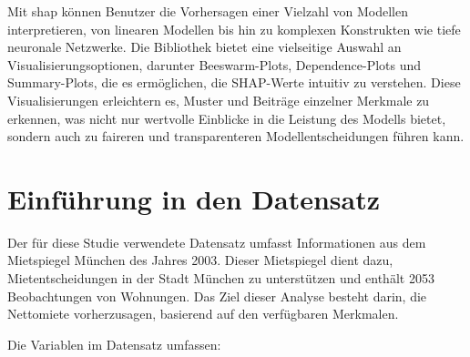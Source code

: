 Mit \textsf{shap} können Benutzer die Vorhersagen einer Vielzahl von Modellen interpretieren, 
von linearen Modellen bis hin zu komplexen Konstrukten wie tiefe neuronale Netzwerke. 
Die Bibliothek bietet eine vielseitige Auswahl an Visualisierungsoptionen, darunter Beeswarm-Plots, Dependence-Plots und 
Summary-Plots, die es ermöglichen, die SHAP-Werte intuitiv zu verstehen.
Diese Visualisierungen erleichtern es, Muster und Beiträge einzelner Merkmale zu erkennen, 
was nicht nur wertvolle Einblicke in die Leistung des Modells bietet, sondern auch zu faireren und transparenteren 
Modellentscheidungen führen kann. 

\section{Einführung in den Datensatz}

Der für diese Studie verwendete Datensatz umfasst Informationen aus dem Mietspiegel München des Jahres 2003. 
Dieser Mietspiegel dient dazu, Mietentscheidungen in der Stadt München zu unterstützen und enthält 
2053 Beobachtungen von Wohnungen. Das Ziel dieser Analyse besteht darin, die Nettomiete
vorherzusagen, basierend auf den verfügbaren Merkmalen.

Die Variablen im Datensatz umfassen:

